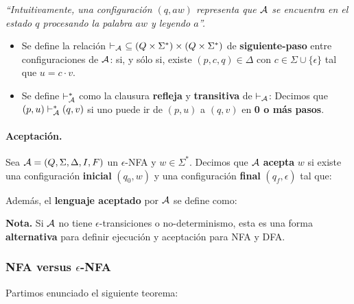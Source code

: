 \textit{``Intuitivamente, una configuración $(q, aw)$ representa que $\mathcal{A}$ se encuentra en el estado $q$ procesando la palabra $aw$ y leyendo $a$''.}
\begin{itemize}
    \item Se define la relación $\vdash_\ca{A}\ \subseteq (Q \times \Sigma^*) \times (Q \times \Sigma^*)$ de \textbf{siguiente-paso} entre configuraciones de $\mathcal{A}$:
          si, y sólo si, existe $(p,c,q) \in \Delta$ con $c \in \Sigma \cup \{\epsilon\}$ tal que $u = c \cdot v$.
    \item Se define $\vdash_{\mathcal{A}}^*$ como la clausura \textbf{refleja} y \textbf{transitiva} de $\vdash_{\mathcal{A}}$:
          Decimos que $(p,u) \vdash_{\mathcal{A}}^* (q,v)$ si uno puede ir de $(p, u)$ a $(q,v)$ en \textbf{0 o más pasos}.
\end{itemize}


\paragraph{Aceptación.} Sea $\mathcal{A} = (Q,\Sigma,\Delta, I, F)$ un $\epsilon$-NFA y $w \in \Sigma^*$. Decimos que $\mathcal{A}$ \textbf{acepta} $w$ si existe una configuración \textbf{inicial} $(q_0, w)$ y una configuración \textbf{final} $(q_f, \epsilon)$ tal que:

Además, el \textbf{lenguaje aceptado} por $\mathcal{A}$ se define como:

\textbf{Nota.} Si $\mathcal{A}$ no tiene $\epsilon$-transiciones o no-determinismo, esta es una forma \textbf{alternativa} para definir ejecución y aceptación para NFA y DFA.

\subsubsection[NFA versus e-NFA]{NFA versus $\epsilon$-NFA}
Partimos enunciado el siguiente teorema:

